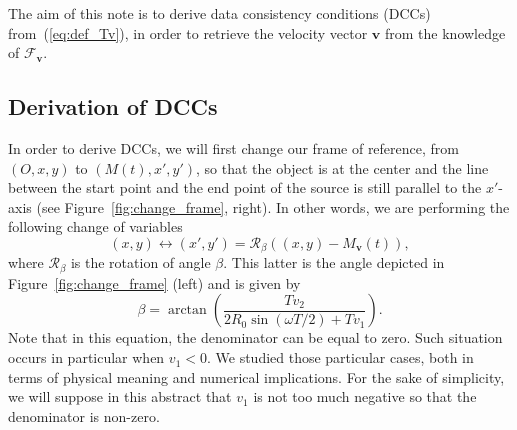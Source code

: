 \documentclass[9pt,technote]{IEEEtran}
\numberwithin{equation}{section}
\newcommand{\bv}{\mathbf{v}}
\newcommand{\Mbv}{M_{\mathbf{v}}}
\newcommand{\Tbv}{\mathcal{F}_{\mathbf{v}}}
\begin{document}
The aim of this note is to derive data consistency conditions (DCCs) from~(\ref{eq:def_Tv}), in order to retrieve the velocity vector $\bv$ from the knowledge of $\Tbv$.

\subsection{Derivation of DCCs}

In order to derive DCCs, we will first change our frame of reference, from $\left(O, x, y\right)$ to $\left(M(t), x', y'\right)$, so that the object is at the center and the line between the start point and the end point of the source is still parallel to the $x'$-axis (see Figure~\ref{fig:change_frame}, right). In other words, we are performing the following change of variables
\begin{equation}
	(x,y) \leftrightarrow (x',y') = \mathcal{R}_{\beta} \left( (x,y)-\Mbv(t) \right),
\end{equation}
where $\mathcal{R}_{\beta}$ is the rotation of angle $\beta$. This latter is the angle depicted in Figure~\ref{fig:change_frame} (left) and is given by
\begin{equation}
	\beta = \arctan \left( \frac{T v_2}{2R_0 \sin(\omega T/2) + T v_1} \right).
\end{equation}
Note that in this equation, the denominator can be equal to zero. Such situation occurs in particular when $v_1 < 0$. We studied those particular cases, both in terms of physical meaning and numerical implications. For the sake of simplicity, we will suppose in this abstract that $v_1$ is not too much negative so that the denominator is non-zero.
\end{document}
